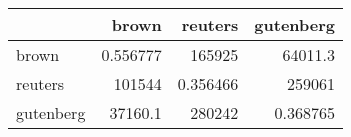 \begin{tabular}{lrrr}
\hline
           &         brown &       reuters &     gutenberg \\
\hline
 brown     &      0.556777 & 165925        &  64011.3      \\
 reuters   & 101544        &      0.356466 & 259061        \\
 gutenberg &  37160.1      & 280242        &      0.368765 \\
\hline
\end{tabular}